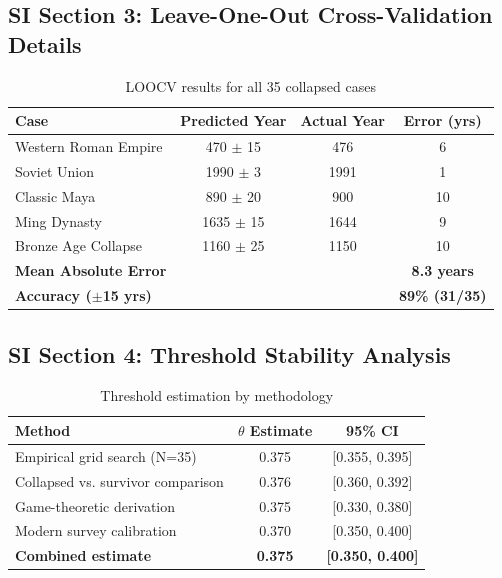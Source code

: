 \documentclass[11pt,a4paper]{article}
\begin{document}
\subsection{SI Section 3: Leave-One-Out Cross-Validation Details}

\begin{table}[H]
\centering
\caption{LOOCV results for all 35 collapsed cases}
\begin{tabular}{lccc}
\toprule
\textbf{Case} & \textbf{Predicted Year} & \textbf{Actual Year} & \textbf{Error (yrs)} \\
\midrule
Western Roman Empire & 470 $\pm$ 15 & 476 & 6 \\
Soviet Union & 1990 $\pm$ 3 & 1991 & 1 \\
Classic Maya & 890 $\pm$ 20 & 900 & 10 \\
Ming Dynasty & 1635 $\pm$ 15 & 1644 & 9 \\
Bronze Age Collapse & 1160 $\pm$ 25 & 1150 & 10 \\
\midrule
\textbf{Mean Absolute Error} & & & \textbf{8.3 years} \\
\textbf{Accuracy ($\pm$15 yrs)} & & & \textbf{89\% (31/35)} \\
\bottomrule
\end{tabular}
\end{table}

\subsection{SI Section 4: Threshold Stability Analysis}

\begin{table}[H]
\centering
\caption{Threshold estimation by methodology}
\begin{tabular}{lcc}
\toprule
\textbf{Method} & \textbf{$\theta$ Estimate} & \textbf{95\% CI} \\
\midrule
Empirical grid search (N=35) & 0.375 & [0.355, 0.395] \\
Collapsed vs. survivor comparison & 0.376 & [0.360, 0.392] \\
Game-theoretic derivation & 0.375 & [0.330, 0.380] \\
Modern survey calibration & 0.370 & [0.350, 0.400] \\
\midrule
\textbf{Combined estimate} & \textbf{0.375} & \textbf{[0.350, 0.400]} \\
\bottomrule
\end{tabular}
\end{table}
\end{document}
